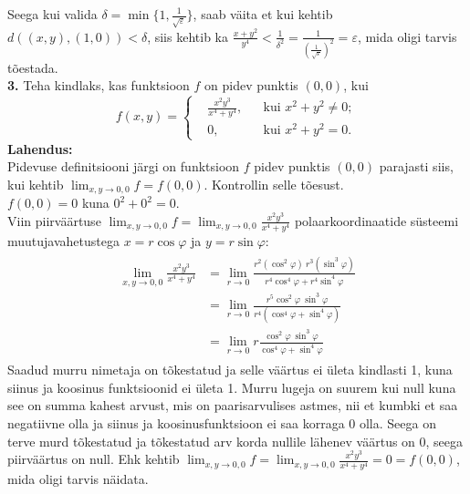 \documentclass{article}
\begin{document}
Seega kui valida $\delta=\min\{1,\frac{1}{\sqrt{\varepsilon}}\}$, saab väita et kui kehtib $d((x,y),(1,0))<\delta$, siis kehtib ka $\frac{x+y^2}{y^4}<\frac{1}{\delta^2}=\frac{1}{(\frac{1}{\sqrt{\varepsilon}})^2}=\varepsilon$, mida oligi tarvis tõestada.
\pagebreak\\
\textbf{3.} Teha kindlaks, kas funktsioon $f$ on pidev punktis $(0,0)$, kui
\begin{equation*}
f(x,y)=
\left\{
\begin{aligned}
&\frac{x^2y^3}{x^4+y^4}, && \text{kui } x^2+y^2\neq0;\\
&0, && \text{kui } x^2+y^2=0.
\end{aligned}
\right.
\end{equation*}
\textbf{Lahendus:}\\
Pidevuse definitsiooni järgi on funktsioon $f$ pidev punktis $(0,0)$ parajasti siis, kui kehtib $\lim_{x,y\to 0,0}f=f(0,0)$. Kontrollin selle tõesust.\\
$f(0,0)=0$ kuna $0^2+0^2=0$.\\
Viin piirväärtuse $\lim_{x,y\to 0,0}f=\lim_{x,y\to 0,0}\frac{x^2y^3}{x^4+y^4}$ polaarkoordinaatide süsteemi muutujavahetustega $x=r\cos \varphi$ ja $y=r\sin\varphi$:
\begin{gather*}
\begin{aligned}
\lim_{x,y\to 0,0}\frac{x^2y^3}{x^4+y^4}&=\lim_{r\to 0}\frac{r^2(\cos^2\varphi)\ r^3(\sin^3\varphi)}{r^4\cos^4\varphi+r^4\sin^4\varphi}\\
&=\lim_{r\to 0}\frac{r^5\cos^2\varphi\ \sin^3\varphi}{r^4(\cos^4\varphi+\sin^4\varphi)}\\
&=\lim_{r\to 0}r\frac{\cos^2\varphi\ \sin^3\varphi}{\cos^4\varphi+\sin^4\varphi}
\end{aligned}
\end{gather*}
Saadud murru nimetaja on tõkestatud ja selle väärtus ei ületa kindlasti 1, kuna siinus ja koosinus funktsioonid ei ületa 1. Murru lugeja on suurem kui null kuna see on summa kahest arvust, mis on paarisarvulises astmes, nii et kumbki et saa negatiivne olla ja siinus ja koosinusfunktsioon ei saa korraga 0 olla. Seega on terve murd tõkestatud ja tõkestatud arv korda nullile lähenev väärtus on 0, seega piirväärtus on null. Ehk kehtib $\lim_{x,y\to 0,0}f=\lim_{x,y\to 0,0}\frac{x^2y^3}{x^4+y^4}=0=f(0,0)$, mida oligi tarvis näidata.
\end{document}
